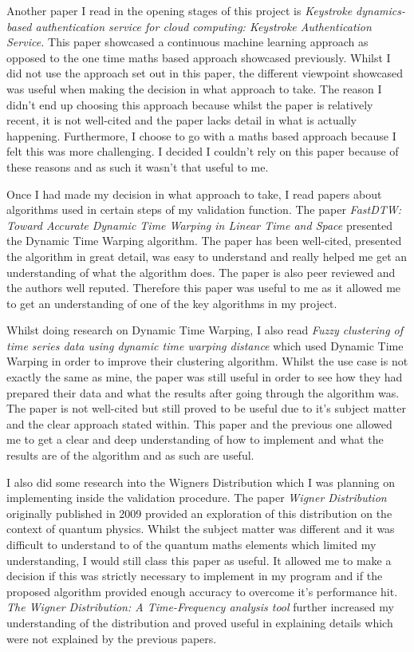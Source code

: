 \documentclass[10pt,a4paper]{report}
\begin{document}
Another paper I read in the opening stages of this project is \emph{Keystroke dynamics-based authentication service for cloud computing: Keystroke Authentication Service.}\cite{cloudComp} This paper showcased a continuous machine learning approach as opposed to the one time maths based approach showcased previously. Whilst I did not use the approach set out in this paper, the different viewpoint showcased was useful when making the decision in what approach to take. The reason I didn't end up choosing this approach because whilst the paper is relatively recent, it is not well-cited and the paper lacks detail in what is actually happening. Furthermore, I choose to go with a maths based approach because I felt this was more challenging. I decided I couldn't rely on this paper because of these reasons and as such it wasn't that useful to me.

Once I had made my decision in what approach to take, I read papers about algorithms used in certain steps of my validation function. The paper \emph{FastDTW: Toward Accurate Dynamic Time Warping in Linear Time and Space}\cite{Salvador2004FastDTWTA} presented the Dynamic Time Warping algorithm. The paper has been well-cited, presented the algorithm in great detail, was easy to understand and really helped me get an understanding of what the algorithm does. The paper is also peer reviewed and the authors well reputed. Therefore this paper was useful to me as it allowed me to get an understanding of one of the key algorithms in my project.

Whilst doing research on Dynamic Time Warping, I also read \emph{Fuzzy clustering of time series data using dynamic time warping distance}\cite{IzakianHesam2015Fcot} which used Dynamic Time Warping in order to improve their clustering algorithm. Whilst the  use case is not exactly the same as mine, the paper was still useful in order to see how they had prepared their data and what the results after going through the algorithm was. The paper is not well-cited but still proved to be useful due to it's subject matter and the clear approach stated within. This paper and the previous one allowed me to get a clear and deep understanding of how to implement and what the results are of the algorithm and as such are useful. 

I also did some research into the Wigners Distribution which I was planning on implementing inside the validation procedure. The paper \emph{Wigner Distribution}\cite{inbook} originally published in 2009 provided an exploration of this distribution on the context of quantum physics. Whilst the subject matter was different and it was difficult to understand to of the quantum maths elements which limited my understanding, I would still class this paper as useful. It allowed me to make a decision if this was strictly necessary to implement in my program and if the proposed algorithm provided enough accuracy to overcome it's performance hit. \emph{The Wigner Distribution: A Time-Frequency analysis tool}\cite{4766782} further increased my understanding of the distribution and proved useful in explaining details which were not explained by the previous papers.
\end{document}

